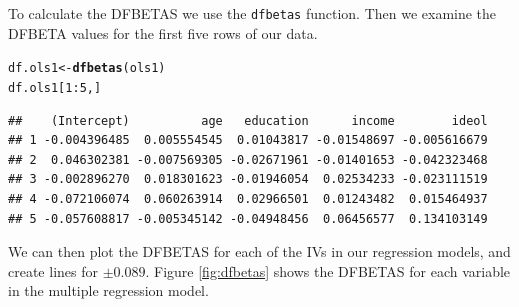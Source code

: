 \documentclass[11pt,openany]{book}\usepackage[]{graphicx}\usepackage[]{color}
\makeatletter
\newcommand{\hlnum}[1]{\textcolor[rgb]{0.686,0.059,0.569}{#1}}%
\newcommand{\hlopt}[1]{\textcolor[rgb]{0,0,0}{#1}}%
\newcommand{\hlstd}[1]{\textcolor[rgb]{0.345,0.345,0.345}{#1}}%
\newcommand{\hlkwb}[1]{\textcolor[rgb]{0.69,0.353,0.396}{#1}}%
\newcommand{\hlkwd}[1]{\textcolor[rgb]{0.737,0.353,0.396}{\textbf{#1}}}%
\newenvironment{kframe}{%
 \def\at@end@of@kframe{}%
 \ifinner\ifhmode%
  \def\at@end@of@kframe{\end{minipage}}%
  \begin{minipage}{\columnwidth}%
 \fi\fi%
 \def\FrameCommand##1{\hskip\@totalleftmargin \hskip-\fboxsep
 \colorbox{shadecolor}{##1}\hskip-\fboxsep
     \hskip-\linewidth \hskip-\@totalleftmargin \hskip\columnwidth}%
 \MakeFramed {\advance\hsize-\width
   \@totalleftmargin\z@ \linewidth\hsize
   \@setminipage}}%
 {\par\unskip\endMakeFramed%
 \at@end@of@kframe}
\newenvironment{knitrout}{}{} %
\renewenvironment{knitrout}{\begin{singlespace}}{\end{singlespace}} %
\makeatother
\begin{document}
To calculate the DFBETAS we use the \texttt{dfbetas} function. Then we examine the DFBETA values for the first five rows of our data. 
\begin{knitrout}
\color{fgcolor}\begin{kframe}
\begin{alltt}
\hlstd{df.ols1} \hlkwb{<-} \hlkwd{dfbetas}\hlstd{(ols1)}
\hlstd{df.ols1[}\hlnum{1}\hlopt{:}\hlnum{5}\hlstd{, ]}
\end{alltt}
\begin{verbatim}
##    (Intercept)          age   education      income        ideol
## 1 -0.004396485  0.005554545  0.01043817 -0.01548697 -0.005616679
## 2  0.046302381 -0.007569305 -0.02671961 -0.01401653 -0.042323468
## 3 -0.002896270  0.018301623 -0.01946054  0.02534233 -0.023111519
## 4 -0.072106074  0.060263914  0.02966501  0.01243482  0.015464937
## 5 -0.057608817 -0.005345142 -0.04948456  0.06456577  0.134103149
\end{verbatim}
\end{kframe}
\end{knitrout}
We can then plot the DFBETAS for each of the IVs in our  regression models, and create lines for $\pm 0.089$.  Figure \ref{fig:dfbetas} shows the DFBETAS for each variable in the multiple regression model.   
\end{document}
